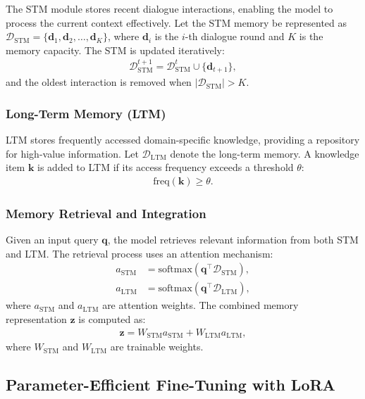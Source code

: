 The STM module stores recent dialogue interactions, enabling the model to process the current context effectively. Let the STM memory be represented as \( \mathcal{D}_{\text{STM}} = \{ \mathbf{d}_1, \mathbf{d}_2, \ldots, \mathbf{d}_K \} \), where \( \mathbf{d}_i \) is the \( i \)-th dialogue round and \( K \) is the memory capacity. The STM is updated iteratively:
\begin{align}
\mathcal{D}_{\text{STM}}^{t+1} = \mathcal{D}_{\text{STM}}^t \cup \{\mathbf{d}_{t+1}\},
\end{align}
and the oldest interaction is removed when \( |\mathcal{D}_{\text{STM}}| > K \).

\subsubsection{Long-Term Memory (LTM)}

LTM stores frequently accessed domain-specific knowledge, providing a repository for high-value information. Let \( \mathcal{D}_{\text{LTM}} \) denote the long-term memory. A knowledge item \( \mathbf{k} \) is added to LTM if its access frequency exceeds a threshold \( \theta \):
\begin{align}
\text{freq}(\mathbf{k}) \geq \theta.
\end{align}

\subsubsection{Memory Retrieval and Integration}

Given an input query \( \mathbf{q} \), the model retrieves relevant information from both STM and LTM. The retrieval process uses an attention mechanism:
\begin{align}
a_{\text{STM}} &= \text{softmax}(\mathbf{q}^\top \mathcal{D}_{\text{STM}}), \\
a_{\text{LTM}} &= \text{softmax}(\mathbf{q}^\top \mathcal{D}_{\text{LTM}}),
\end{align}
where \( a_{\text{STM}} \) and \( a_{\text{LTM}} \) are attention weights. The combined memory representation \( \mathbf{z} \) is computed as:
\begin{align}
\mathbf{z} = W_{\text{STM}} a_{\text{STM}} + W_{\text{LTM}} a_{\text{LTM}},
\end{align}
where \( W_{\text{STM}} \) and \( W_{\text{LTM}} \) are trainable weights.

\subsection{Parameter-Efficient Fine-Tuning with LoRA}

